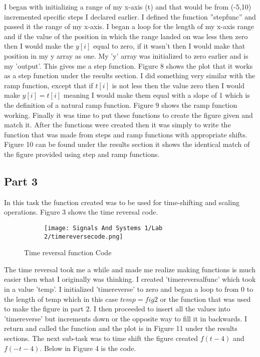 \documentclass[12pt,a4paper]{article}
\begin{document}
\clearpage
I began with initializing a range of my x-axis (t)  and that would be from (-5,10) incremented specific steps I declared earlier. I defined the function ''stepfunc'' and passed it the range of my x-axis. I began a loop for the length of my x-axis range and if the value of the position in which the range landed on was less then zero then I would make the $y[i]$ equal to zero, if it wasn't then I would make that position in my y array as one. My 'y' array was initialized to zero earlier and is my 'output'. This gives me a step function. Figure 8 shows the plot that it works as a step function under the results section. I did something very similar with the ramp function, except that if $t[i]$ is not less then the value zero then I would make $y[i]=t[i]$ meaning I would make them equal with a slope of 1 which is the definition of a natural ramp function. Figure 9 shows the ramp function working. Finally it was time to put these functions to create the figure given and match it. After the functions were created then it was simply to write the function that was made from steps and ramp functions with appropriate shifts. Figure 10 can be found under the results section it shows the identical match of the figure provided using step and ramp functions.



\subsection{Part 3}
In this task the function created was to be used for time-shifting and scaling operations. Figure 3 shows the time reversal code.

\begin{figure}[h]
\begin{subfigure}{ 1\textwidth}
\texttt{[image: Signals And Systems 1/Lab 2/timereversecode.png]}
\end{subfigure}
\caption{Time reversal function Code}
\label{fig:image2}
\end{figure}
\clearpage
\noindent The time reversal took me a while and made me realize making functions is much easier then what I originally was thinking. I created 'timereversalfunc' which took in a value 'temp'. I initialized 'timereverse' to zero and began a loop to from 0 to the length of temp which in this case $temp= fig2$ or the function that was used to make the figure in part 2. I then proceeded to insert all the values into 'timereverse' but increments down or the opposite way to fill it in backwards. I return and called the function and the plot is in Figure 11 under the results sections.
\newline
\newline
\noindent The next sub-task was to time shift the figure created $f(t-4)$ and $f(-t-4)$. Below in Figure 4 is the code.
\end{document}
